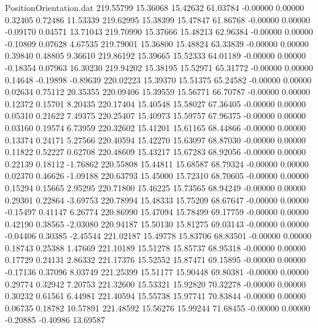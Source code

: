 \begin{filecontents}{PositionOrientation.dat}
 219.55799   15.36068   15.42632    61.03784   -0.00000    0.00000    0.32405    0.72486   11.53339
 219.62995   15.38399   15.47847    61.86768   -0.00000    0.00000   -0.09170    0.04571   13.71043
 219.70990   15.37666   15.48213    62.96384   -0.00000    0.00000   -0.10809    0.07628    4.67535
 219.79001   15.36800   15.48824    63.33839   -0.00000    0.00000    0.39840    0.48805    9.36610
 219.86192   15.39665   15.52333    64.01189   -0.00000    0.00000   -0.18354    0.07963   16.30230
 219.94202   15.38195   15.52971    65.31772   -0.00000    0.00000    0.14648   -0.19898   -0.89639
 220.02223   15.39370   15.51375    65.24582   -0.00000    0.00000    0.02634    0.75112   20.35355
 220.09406   15.39559   15.56771    66.70787   -0.00000    0.00000    0.12372    0.15701    8.20435
 220.17404   15.40548   15.58027    67.36405   -0.00000    0.00000    0.05310    0.21622    7.49375
 220.25407   15.40973   15.59757    67.96375   -0.00000    0.00000    0.03160    0.19574    6.73959
 220.32602   15.41201   15.61165    68.44866   -0.00000    0.00000    0.13374    0.24171    5.27566
 220.40594   15.42270   15.63097    68.87030   -0.00000    0.00000    0.11822    0.52227    0.62708
 220.48609   15.43217   15.67283    68.92056   -0.00000    0.00000    0.22139    0.18112   -1.76862
 220.55808   15.44811   15.68587    68.79324   -0.00000    0.00000    0.02370    0.46626   -1.09188
 220.63793   15.45000   15.72310    68.70605   -0.00000    0.00000    0.15294    0.15665    2.95295
 220.71800   15.46225   15.73565    68.94249   -0.00000    0.00000    0.29301    0.22864   -3.69753
 220.78994   15.48333   15.75209    68.67647   -0.00000    0.00000   -0.15497    0.41147    6.26774
 220.86990   15.47094   15.78499    69.17759   -0.00000    0.00000    0.42190    0.38565   -2.03080
 220.94187   15.50130   15.81275    69.03143   -0.00000    0.00000   -0.04406    0.30385   -2.45544
 221.02187   15.49778   15.83706    68.83501   -0.00000    0.00000    0.18743    0.25388    1.47669
 221.10189   15.51278   15.85737    68.95318   -0.00000    0.00000    0.17729    0.24131    2.86332
 221.17376   15.52552   15.87471    69.15895   -0.00000    0.00000   -0.17136    0.37096    8.03749
 221.25399   15.51177   15.90448    69.80381   -0.00000    0.00000    0.29774    0.32942    7.20753
 221.32600   15.53321   15.92820    70.32278   -0.00000    0.00000    0.30232    0.61561    6.44981
 221.40594   15.55738   15.97741    70.83844   -0.00000    0.00000    0.06735    0.18782   10.57891
 221.48592   15.56276   15.99244    71.68455   -0.00000    0.00000   -0.20885   -0.40986   13.69587

\end{filecontents}
